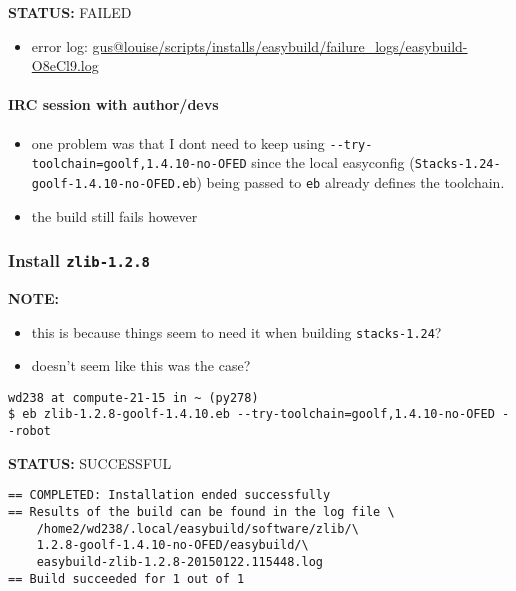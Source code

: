 \documentclass[letterpaper]{scrartcl}
\begin{document}
\textbf{STATUS:} FAILED

\begin{itemize}
\itemsep1pt\parskip0pt
\item
  error log:
  \href{file:///home/gus/remote_mounts/louise/scripts/installs/easybuild/failure_logs/easybuild-O8eCl9.log}{gus@louise/scripts/installs/easybuild/failure\_logs/easybuild-O8eCl9.log}
\end{itemize}

\paragraph{IRC session with
author/devs}\label{irc-session-with-authordevs}

\begin{itemize}
\itemsep1pt\parskip0pt
\item
  one problem was that I dont need to keep using
  \texttt{-\/-try-toolchain=goolf,1.4.10-no-OFED} since the local
  easyconfig (\texttt{Stacks-1.24-goolf-1.4.10-no-OFED.eb}) being passed
  to \texttt{eb} already defines the toolchain.
\item
  the build still fails however
\end{itemize}

\subsubsection{Install \texttt{zlib-1.2.8}}\label{install-zlib-1.2.8}

\textbf{NOTE:}

\begin{itemize}
\itemsep1pt\parskip0pt
\item
  this is because things seem to need it when building
  \texttt{stacks-1.24}?
\item
  doesn't seem like this was the case?
\end{itemize}

\begin{verbatim}
wd238 at compute-21-15 in ~ (py278) 
$ eb zlib-1.2.8-goolf-1.4.10.eb --try-toolchain=goolf,1.4.10-no-OFED --robot
\end{verbatim}

\textbf{STATUS:} SUCCESSFUL

\begin{verbatim}
== COMPLETED: Installation ended successfully
== Results of the build can be found in the log file \
    /home2/wd238/.local/easybuild/software/zlib/\
    1.2.8-goolf-1.4.10-no-OFED/easybuild/\
    easybuild-zlib-1.2.8-20150122.115448.log
== Build succeeded for 1 out of 1
\end{verbatim}
\end{document}
